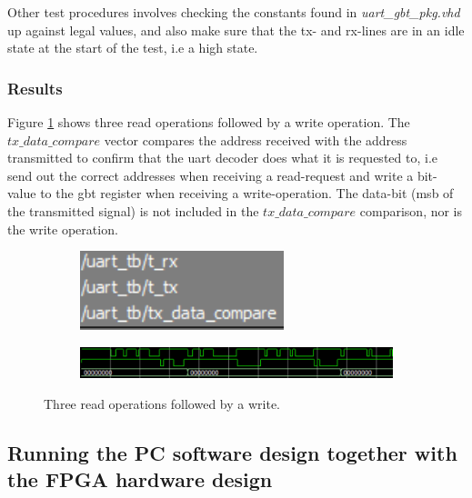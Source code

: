 \documentclass[main.tex]{subfiles}
\begin{document}
Other test procedures involves checking the constants found in \textit{uart\_gbt\_pkg.vhd} up against legal values, and also make sure that the tx- and rx-lines are in an idle state at the start of the test, i.e a high state.

\subsubsection{Results}

Figure \ref{fig:uarttb} shows three read operations followed by a write operation. The $tx\_data\_compare$ vector compares the address received with the address transmitted to confirm that the \gls{uart} decoder does what it is requested to, i.e send out the correct addresses when receiving a read-request and write a bit-value to the \gls{gbt} register when receiving a write-operation. The data-bit (\gls{msb} of the transmitted signal) is not included in the $tx\_data\_compare$ comparison, nor is the write operation. 

\begin{figure}
    \centering
    \begin{subfigure}{0.18\textwidth}
        \centering
        \includegraphics[width=\linewidth]{../img/uart_tb_0}
    \end{subfigure}%
    \begin{subfigure}{0.7\textwidth}
        \centering
        \includegraphics[width=\linewidth]{../img/uart_tb_1}
    \end{subfigure}
    \caption{Three read operations followed by a write. }
    \label{fig:uarttb}
\end{figure}

\subsection{Running the PC software design together with the FPGA hardware design} \label{test:designrun}
\end{document}
